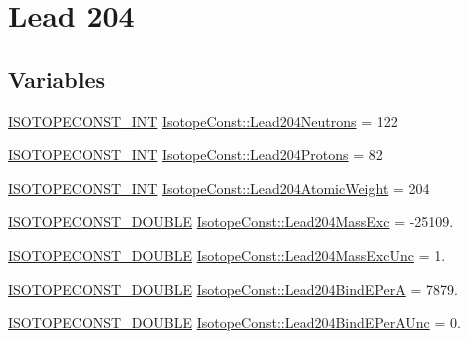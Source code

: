 \hypertarget{group___isotope_const-_lead-_pb204}{}\section{Lead 204}
\label{group___isotope_const-_lead-_pb204}
\subsection*{Variables}
\begin{DoxyCompactItemize}
\item 
\mbox{\hyperlink{group___isotope_const-_macros_ga5f18360b3e99483a35c32d789e62621c}{I\+S\+O\+T\+O\+P\+E\+C\+O\+N\+S\+T\+\_\+\+I\+NT}} \mbox{\hyperlink{group___isotope_const-_lead-_pb204_ga1ac4bdbda688f50b3785122915bc8249}{Isotope\+Const\+::\+Lead204\+Neutrons}} = 122
\item 
\mbox{\hyperlink{group___isotope_const-_macros_ga5f18360b3e99483a35c32d789e62621c}{I\+S\+O\+T\+O\+P\+E\+C\+O\+N\+S\+T\+\_\+\+I\+NT}} \mbox{\hyperlink{group___isotope_const-_lead-_pb204_ga34cc7931adf9d1eb1bb73f87ab44d95f}{Isotope\+Const\+::\+Lead204\+Protons}} = 82
\item 
\mbox{\hyperlink{group___isotope_const-_macros_ga5f18360b3e99483a35c32d789e62621c}{I\+S\+O\+T\+O\+P\+E\+C\+O\+N\+S\+T\+\_\+\+I\+NT}} \mbox{\hyperlink{group___isotope_const-_lead-_pb204_ga5dd4d7df32c0f79e08b9278a889520a3}{Isotope\+Const\+::\+Lead204\+Atomic\+Weight}} = 204
\item 
\mbox{\hyperlink{group___isotope_const-_macros_ga8f45a7272ce02c0b4c65c44636ed719a}{I\+S\+O\+T\+O\+P\+E\+C\+O\+N\+S\+T\+\_\+\+D\+O\+U\+B\+LE}} \mbox{\hyperlink{group___isotope_const-_lead-_pb204_gaa580e2249af7248d86385de01b31b6d3}{Isotope\+Const\+::\+Lead204\+Mass\+Exc}} = -\/25109.
\item 
\mbox{\hyperlink{group___isotope_const-_macros_ga8f45a7272ce02c0b4c65c44636ed719a}{I\+S\+O\+T\+O\+P\+E\+C\+O\+N\+S\+T\+\_\+\+D\+O\+U\+B\+LE}} \mbox{\hyperlink{group___isotope_const-_lead-_pb204_ga84f2af8709e279742117f14125f1b732}{Isotope\+Const\+::\+Lead204\+Mass\+Exc\+Unc}} = 1.
\item 
\mbox{\hyperlink{group___isotope_const-_macros_ga8f45a7272ce02c0b4c65c44636ed719a}{I\+S\+O\+T\+O\+P\+E\+C\+O\+N\+S\+T\+\_\+\+D\+O\+U\+B\+LE}} \mbox{\hyperlink{group___isotope_const-_lead-_pb204_ga6def4857d8c265a6833d48bd8fd39fcc}{Isotope\+Const\+::\+Lead204\+Bind\+E\+PerA}} = 7879.
\item 
\mbox{\hyperlink{group___isotope_const-_macros_ga8f45a7272ce02c0b4c65c44636ed719a}{I\+S\+O\+T\+O\+P\+E\+C\+O\+N\+S\+T\+\_\+\+D\+O\+U\+B\+LE}} \mbox{\hyperlink{group___isotope_const-_lead-_pb204_ga0e325ef7a67ae3bee6eb321e9320a24a}{Isotope\+Const\+::\+Lead204\+Bind\+E\+Per\+A\+Unc}} = 0.

\end{DoxyCompactItemize}
